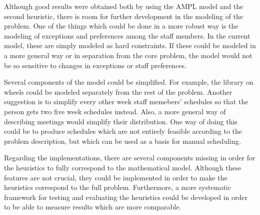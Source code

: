 Although good results were obtained both by using the AMPL model and the second heuristic, there is room for further development in the modeling of the problem. One of the things which could be done in a more robust way is the modeling of exceptions and preferences among the staff members. In the current model, these are simply modeled as hard constraints. If these could be modeled in a more general way or in separation from the core problem, the model would not be so sensitive to changes in exceptions or staff preferences.

Several components of the model could be simplified. For example, the library on wheels could be modeled separately from the rest of the problem. Another suggestion is to simplify every other week staff memebers' schedules so that the person gets two five week schedules instead. Also, a more general way of describing meetings would simplify their distribution. One way of doing this could be to produce schedules which are not entirely feasible according to the problem description, but which can be used as a basis for manual scheduling.

Regarding the implementations, there are several components missing in order for the heuristics to fully correspond to the mathematical model. Although these features are not crucial, they could be implemented in order to make the heuristics correspond to the full problem. Furthermore, a more systematic framework for testing and evaluating the heuristics could be developed in order to be able to measure results which are more comparable.

